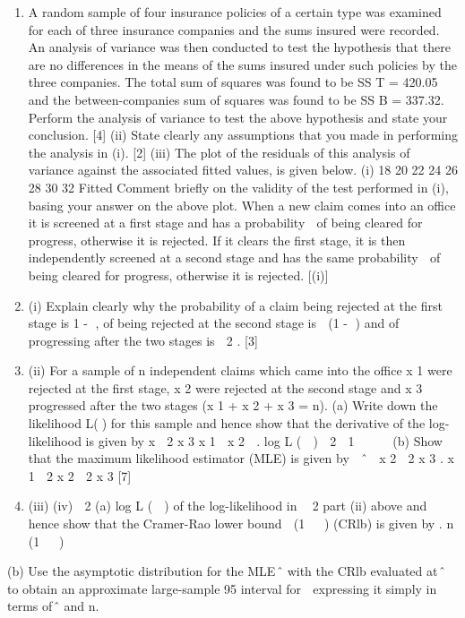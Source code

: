 \documentclass[a4paper,12pt]{article}
\begin{document}
\begin{enumerate}%
\item A random sample of four insurance policies of a certain type was examined for each of three insurance companies and the sums insured were recorded. An analysis of variance was then conducted to test the hypothesis that there are no differences in the
means of the sums insured under such policies by the three companies.
The total sum of squares was found to be SS T = 420.05 and the between-companies
sum of squares was found to be SS B = 337.32.
Perform the analysis of variance to test the above hypothesis and state your
conclusion.
[4]
(ii) State clearly any assumptions that you made in performing the analysis in (i).
[2]
(iii) The plot of the residuals of this analysis of variance against the associated
fitted values, is given below.
(i)
18
20
22
24
26
28
30
32
Fitted
Comment briefly on the validity of the test performed in (i), basing your
answer on the above plot.
\ite When a new claim comes into an office it is screened at a first stage and has a probability  of being cleared for progress, otherwise it is rejected. If it clears the first stage, it is then independently screened at a second stage and has the same probability
 of being cleared for progress, otherwise it is rejected.
[(i)]
\item (i) Explain clearly why the probability of a claim being rejected at the first stage
is 1 - , of being rejected at the second stage is  (1 - ) and of progressing after the two stages is  2 .
[3]
\item (ii) For a sample of n independent claims which came into the office x 1 were rejected at the first stage, x 2 were rejected at the second stage and x 3
progressed after the two stages (x 1 + x 2 + x 3 = n).
(a)
Write down the likelihood L() for this sample and hence show that the derivative of the log-likelihood is given by
x  2 x 3 x 1  x 2

.
log L (  )  2

1  


(b)
Show that the maximum likelihood estimator (MLE) is given by
 ˆ 
x 2  2 x 3
.
x 1  2 x 2  2 x 3
[7]
\item (iii)
(iv)

2
(a) log L (  ) of the log-likelihood in
 2
part (ii) above and hence show that the Cramer-Rao lower bound
 (1   )
(CRlb) is given by
.
n (1   )
\end{enumerate}
(b) Use the asymptotic distribution for the MLE ̂ with the CRlb
evaluated at ̂ to obtain an approximate large-sample 95%
interval for  expressing it simply in terms of ̂ and n.
\end{document}
